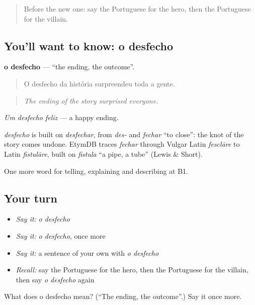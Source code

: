 \label{lesson:PT-C325-desfecho}



\begin{quote}
Before the new one: say the Portuguese for the hero, then the Portuguese for the villain.
\end{quote}

\subsection*{You'll want to know: o desfecho}
\textbf{o desfecho} — \textquotedblleft{}the ending, the outcome\textquotedblright{}.

\begin{quote}
O desfecho da história surpreendeu toda a gente.
\end{quote}

\begin{quote}
\emph{The ending of the story surprised everyone.}
\end{quote}

\emph{Um desfecho feliz} — a happy ending.

\begin{cousinweb}
\emph{desfecho} is built on \emph{desfechar}, from \emph{des-} and \emph{fechar} \textquotedblleft{}to close\textquotedblright{}: the knot of the story comes undone. EtymDB traces \emph{fechar} through Vulgar Latin \emph{fesclāre} to Latin \emph{fistulāre}, built on \emph{fistula} \textquotedblleft{}a pipe, a tube\textquotedblright{} (Lewis \& Short).
\end{cousinweb}

\begin{grammarlens}[title={What you've built}]
One more word for telling, explaining and describing at B1.
\end{grammarlens}

\subsection*{Your turn}
\begin{itemize}
\raggedright
  \item \emph{Say it:} \emph{o desfecho}
  \item \emph{Say it:} \emph{o desfecho}, once more
  \item \emph{Say it:} a sentence of your own with \emph{o desfecho}
  \item \emph{Recall:} say the Portuguese for the hero, then the Portuguese for the villain, then say \emph{o desfecho} again
\end{itemize}

\begin{tcolorbox}[breakable,colback=teal!4,colframe=teal!35!black,title={Before you move on}]
What does o desfecho mean? (\textquotedblleft{}The ending, the outcome\textquotedblright{}.) Say it once more.
\end{tcolorbox}
